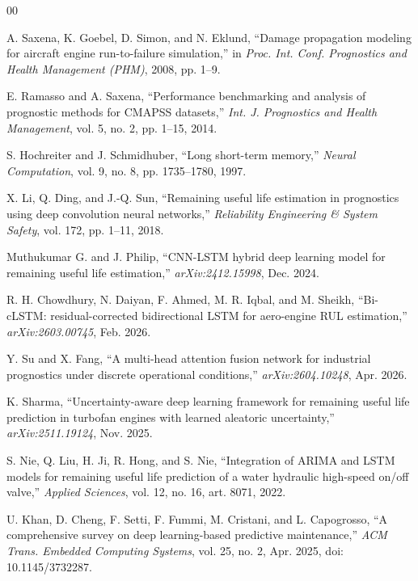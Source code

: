 \documentclass[conference]{IEEEtran}
\begin{document}
\small
\begin{thebibliography}{00}

 A. Saxena, K. Goebel, D. Simon, and N. Eklund, ``Damage propagation modeling for aircraft engine run-to-failure simulation,'' in \emph{Proc. Int. Conf. Prognostics and Health Management (PHM)}, 2008, pp. 1--9.

 E. Ramasso and A. Saxena, ``Performance benchmarking and analysis of prognostic methods for CMAPSS datasets,'' \emph{Int. J. Prognostics and Health Management}, vol. 5, no. 2, pp. 1--15, 2014.

 S. Hochreiter and J. Schmidhuber, ``Long short-term memory,'' \emph{Neural Computation}, vol. 9, no. 8, pp. 1735--1780, 1997.

 X. Li, Q. Ding, and J.-Q. Sun, ``Remaining useful life estimation in prognostics using deep convolution neural networks,'' \emph{Reliability Engineering \& System Safety}, vol. 172, pp. 1--11, 2018.

 Muthukumar G. and J. Philip, ``CNN-LSTM hybrid deep learning model for remaining useful life estimation,'' \emph{arXiv:2412.15998}, Dec. 2024.

 R. H. Chowdhury, N. Daiyan, F. Ahmed, M. R. Iqbal, and M. Sheikh, ``Bi-cLSTM: residual-corrected bidirectional LSTM for aero-engine RUL estimation,'' \emph{arXiv:2603.00745}, Feb. 2026.

 Y. Su and X. Fang, ``A multi-head attention fusion network for industrial prognostics under discrete operational conditions,'' \emph{arXiv:2604.10248}, Apr. 2026.

 K. Sharma, ``Uncertainty-aware deep learning framework for remaining useful life prediction in turbofan engines with learned aleatoric uncertainty,'' \emph{arXiv:2511.19124}, Nov. 2025.

 S. Nie, Q. Liu, H. Ji, R. Hong, and S. Nie, ``Integration of ARIMA and LSTM models for remaining useful life prediction of a water hydraulic high-speed on/off valve,'' \emph{Applied Sciences}, vol. 12, no. 16, art. 8071, 2022.

 U. Khan, D. Cheng, F. Setti, F. Fummi, M. Cristani, and L. Capogrosso, ``A comprehensive survey on deep learning-based predictive maintenance,'' \emph{ACM Trans. Embedded Computing Systems}, vol. 25, no. 2, Apr. 2025, doi: 10.1145/3732287.


\end{thebibliography}
\end{document}
